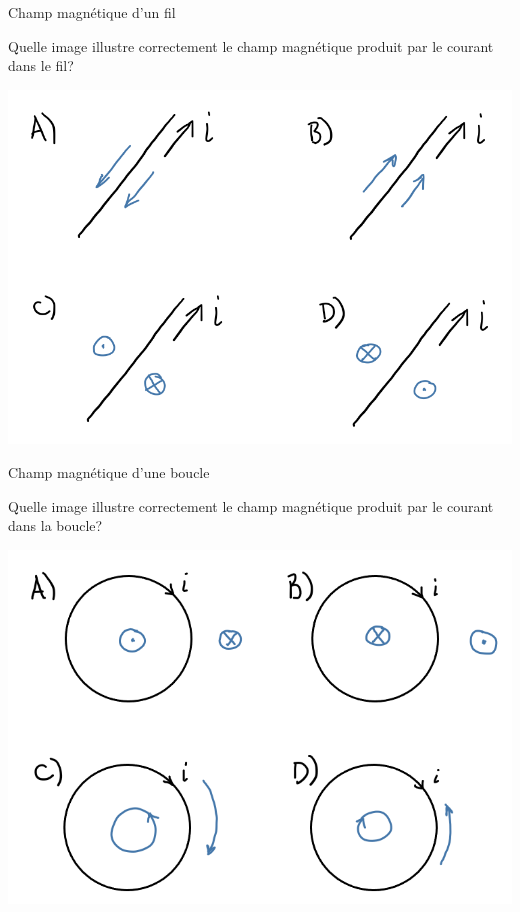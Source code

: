\documentclass{beamer}
\begin{document}
\begin{frame}[t]{Champ magnétique d'un fil}
  
  Quelle image illustre correctement le champ magnétique produit par le courant
  dans le fil?

  \begin{center}
    \includegraphics[scale=0.4]{figures/champ_fil_ex2.png}
  \end{center}

\end{frame}


\begin{frame}[t]{Champ magnétique d'une boucle}
  
  Quelle image illustre correctement le champ magnétique produit par le courant
  dans la boucle?

  \begin{center}
    \includegraphics[scale=0.4]{figures/champ_boucle_ex1.png}
  \end{center}

\end{frame}
\end{document}
